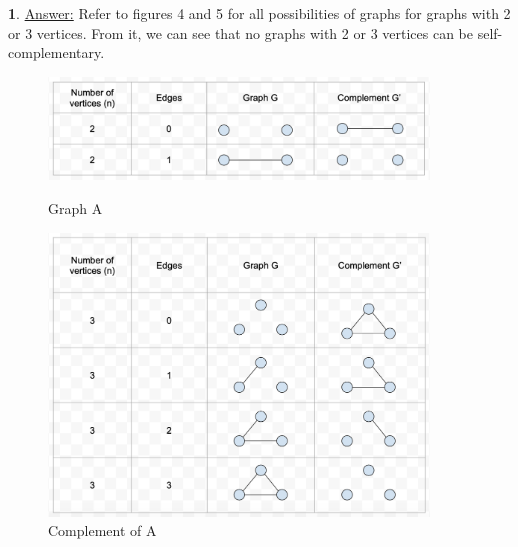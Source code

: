 \documentclass[12pt,a4paper]{article}
\theoremstyle{definition}
\newtheorem{problem}{}
\begin{document}
\begin{problem}
\underline{Answer:} Refer to figures 4 and 5 for all possibilities of graphs for graphs with 2 or 3 vertices. From it, we can see that no graphs with 2 or 3 vertices can be self-complementary. 

\begin{figure}[H]
    \centering
    \begin{minipage}{0.5\textwidth}
        \centering
        \includegraphics[width=0.9\textwidth]{q5a.png} %
        \caption{Graph A}
    \end{minipage}\hfill
    \begin{minipage}{0.5\textwidth}
        \centering
        \includegraphics[width=0.9\textwidth]{q5b.png} %
        \caption{Complement of A}
    \end{minipage}
\end{figure}
\end{problem}
\end{document}
